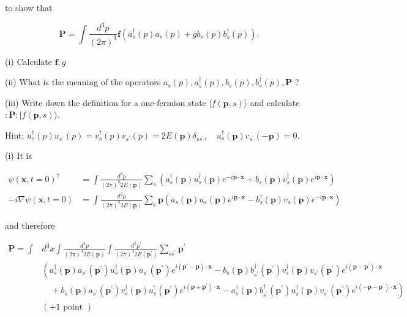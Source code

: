 \documentclass[10pt, letterpaper]{article}
\begin{document}
to show that

$$
\mathbf{P}=\int \frac{d^3 p}{(2 \pi)^3} \mathbf{f}\left(a_s^{\dagger}(p) a_s(p)+g b_s(p) b_s^{\dagger}(p)\right) .
$$

(i) Calculate $\mathbf{f}, g$

(ii) What is the meaning of the operators $a_s(p), a_s^{\dagger}(p), b_s(p), b_s^{\dagger}(p), \mathbf{P}$ ?

(iii) Write down the definition for a one-fermion state $|f(\mathbf{p}, s)\rangle$ and calculate $: \mathbf{P}:|f(\mathbf{p}, s)\rangle$.

Hint: $u_s^{\dagger}(p) u_{s^{\prime}}(p)=v_s^{\dagger}(p) v_{s^{\prime}}(p)=2 E(\mathbf{p}) \delta_{s s^{\prime}}, \quad u_s^{\dagger}(\mathbf{p}) v_{s^{\prime}}(-\mathbf{p})=0$.




(i) It is

$$
\begin{aligned}
\psi(\mathbf{x}, t=0)^{\dagger} & =\int \frac{d^3 p}{(2 \pi)^3 2 E(\mathbf{p})} \sum_s\left(a_s^{\dagger}(\mathbf{p}) u_s^{\dagger}(\mathbf{p}) e^{-i \mathbf{p} \cdot \mathbf{x}}+b_s(\mathbf{p}) v_s^{\dagger}(\mathbf{p}) e^{i \mathbf{p} \cdot \mathbf{x}}\right) \\
-i \nabla \psi(\mathbf{x}, t=0) & =\int \frac{d^3 p}{(2 \pi)^3 2 E(\mathbf{p})} \sum_s \mathbf{p}\left(a_s(\mathbf{p}) u_s(\mathbf{p}) e^{i \mathbf{p} \cdot \mathbf{x}}-b_s^{\dagger}(\mathbf{p}) v_s(\mathbf{p}) e^{-i \mathbf{p} \cdot \mathbf{x}}\right)
\end{aligned}
$$

and therefore

$$
\begin{aligned}
\mathbf{P}=\int & d^3 x \int \frac{d^3 p}{(2 \pi)^3 2 E(\mathbf{p})} \int \frac{d^3 p^{\prime}}{(2 \pi)^3 2 E\left(\mathbf{p}^{\prime}\right)} \sum_{s s^{\prime}} \mathbf{p}^{\prime} \\
& \left(a_s^{\dagger}(\mathbf{p}) a_{s^{\prime}}\left(\mathbf{p}^{\prime}\right) u_s^{\dagger}(\mathbf{p}) u_{s^{\prime}}\left(\mathbf{p}^{\prime}\right) e^{i\left(\mathbf{p}^{\prime}-\mathbf{p}\right) \cdot \mathbf{x}}-b_s(\mathbf{p}) b_{s^{\prime}}^{\dagger}\left(\mathbf{p}^{\prime}\right) v_s^{\dagger}(\mathbf{p}) v_{s^{\prime}}\left(\mathbf{p}^{\prime}\right) e^{i\left(\mathbf{p}-\mathbf{p}^{\prime}\right) \cdot \mathbf{x}}\right. \\
& \left.\quad+b_s(\mathbf{p}) a_{s^{\prime}}\left(\mathbf{p}^{\prime}\right) v_s^{\dagger}(\mathbf{p}) u_s^{\prime}\left(\mathbf{p}^{\prime}\right) e^{i\left(\mathbf{p}+\mathbf{p}^{\prime}\right) \cdot \mathbf{x}}-a_s^{\dagger}(\mathbf{p}) b_{s^{\prime}}^{\dagger}\left(\mathbf{p}^{\prime}\right) u_s^{\dagger}(\mathbf{p}) v_{s^{\prime}}\left(\mathbf{p}^{\prime}\right) e^{i\left(-\mathbf{p}-\mathbf{p}^{\prime}\right) \cdot \mathbf{x}}\right) \\
& (+1 \text { point })
\end{aligned}
$$
\end{document}
